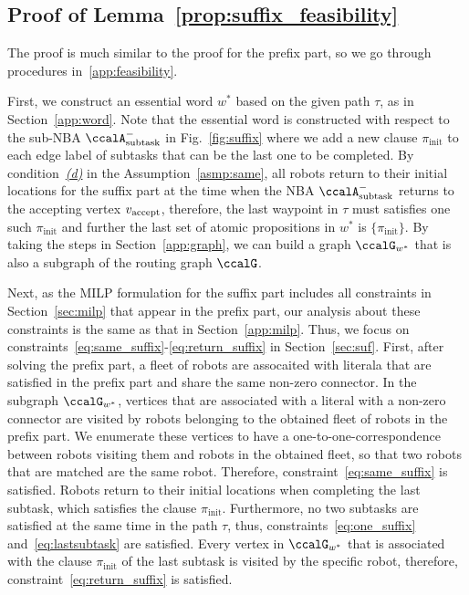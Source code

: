 \documentclass[Afour,sageh,times]{sagej}
\newcommand{\auto}[1]{\ccalA_{\textup{#1}}}
\newcommand{\vertex}[1]{v_{\textup{#1}}}
\begin{document}
{{\subsection{Proof of Lemma~\ref{prop:suffix_feasibility}}\label{app:suffix_feasibility}
The proof is much similar to the proof for the prefix part, so we go through procedures in~\ref{app:feasibility}.

First, we construct an essential word $w^*$ based on the given path $\tau$, as in Section~\ref{app:word}.  Note that the essential word is constructed with respect to the sub-NBA $\auto{subtask}^-$ in Fig.~\ref{fig:suffix} where we add a new clause $\pi_{\text{init}}$ to each edge label of subtasks that can be the last one to be completed. By condition~\hyperref[asmp:d]{\it (d)} in the Assumption~\ref{asmp:same}, all robots return to their initial locations for the suffix part at the  time when the NBA $\auto{subtask}^-$ returns to the accepting vertex $\vertex{accept}$, therefore, the last waypoint in $\tau$ must satisfies one such $\pi_{\text{init}}$ and further the last set of atomic propositions in $w^*$ is $\{\pi_{\text{init}}\}$. By taking the steps in Section~\ref{app:graph}, we can build a graph $\ccalG_{w^*}$ that is also a subgraph of the routing graph $\ccalG$.

Next, as the MILP formulation for the suffix part includes all constraints in Section~\ref{sec:milp} that appear in the prefix part, our analysis about these constraints is the same as that in Section~\ref{app:milp}. Thus, we focus on constraints~\eqref{eq:same_suffix}-\eqref{eq:return_suffix} in Section~\ref{sec:suf}. First, after solving  the prefix part, a fleet of robots are assocaited with literala that are  satisfied in the prefix part and share the same non-zero connector. In the subgraph $\ccalG_{w^*}$,  vertices  that are associated with a literal with a non-zero connector are visited by  robots belonging to the obtained fleet of robots in the prefix part. We enumerate these vertices to  have a one-to-one-correspondence between robots visiting them and robots in the obtained fleet, so that  two  robots that are matched  are the same robot. Therefore, constraint~\eqref{eq:same_suffix} is satisfied. Robots return to their initial locations when completing the last subtask, which satisfies the clause $\pi_{\text{init}}$. Furthermore, no two subtasks are satisfied at the same time in the path $\tau$, thus, constraints~\eqref{eq:one_suffix} and~\eqref{eq:lastsubtask} are  satisfied. Every vertex in $\ccalG_{w^*}$ that is associated with the clause $\pi_{\text{init}}$ of the last subtask is visited by the specific  robot, therefore, constraint~\eqref{eq:return_suffix} is satisfied.

}}
\end{document}
